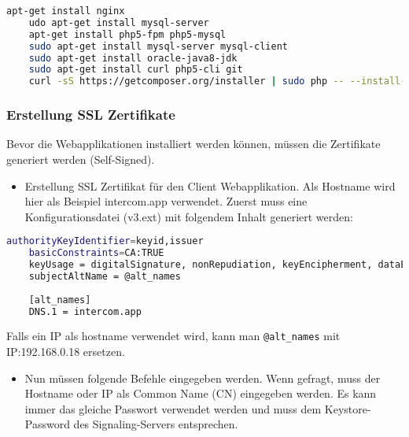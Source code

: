 \begin{lstlisting}[backgroundcolor = \color{snippetcolor},
language = bash,
xleftmargin = 0.5cm,
framexleftmargin = 0.1em,
breaklines=true]
	apt-get install nginx
	udo apt-get install mysql-server
	apt-get install php5-fpm php5-mysql
	sudo apt-get install mysql-server mysql-client
	sudo apt-get install oracle-java8-jdk
	sudo apt-get install curl php5-cli git
	curl -sS https://getcomposer.org/installer | sudo php -- --install-dir=/usr/local/bin --filename=composer
\end{lstlisting}

\subsubsection{Erstellung SSL Zertifikate}
Bevor die Webapplikationen installiert werden können, müssen die Zertifikate generiert werden (Self-Signed). 

\begin{itemize}
	\item Erstellung SSL Zertifikat für den Client Webapplikation. Als Hostname wird hier als Beispiel intercom.app verwendet. Zuerst muss eine Konfigurationsdatei (v3.ext) mit folgendem Inhalt generiert werden:
\end{itemize}

\begin{lstlisting}[backgroundcolor = \color{snippetcolor},
language = bash,
xleftmargin = 0.5cm,
framexleftmargin = 0.1em,
breaklines=true]
	authorityKeyIdentifier=keyid,issuer
	basicConstraints=CA:TRUE
	keyUsage = digitalSignature, nonRepudiation, keyEncipherment, dataEncipherment
	subjectAltName = @alt_names
	
	[alt_names]
	DNS.1 = intercom.app
\end{lstlisting}
Falls ein IP als hostname verwendet wird, kann man \texttt{@alt\_names} mit IP:192.168.0.18 ersetzen.

\begin{itemize}
	\item 
	Nun müssen folgende Befehle eingegeben werden. Wenn gefragt, muss der Hostname oder IP als Common Name (CN) eingegeben werden. Es kann immer das gleiche Passwort verwendet werden und muss dem Keystore-Password des Signaling-Servers entsprechen.
\end{itemize}

